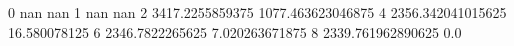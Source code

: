 0 nan nan
1 nan nan
2 3417.2255859375 1077.463623046875
4 2356.342041015625 16.580078125
6 2346.7822265625 7.020263671875
8 2339.761962890625 0.0
